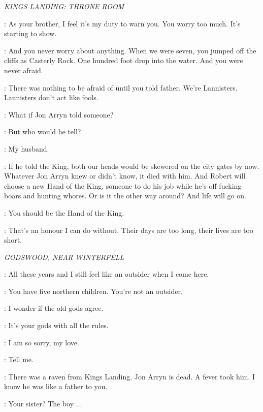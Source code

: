 \scene

\textit{KINGS LANDING: THRONE ROOM} 


\JAIME: As your brother, I feel it's my duty to warn you. You worry too much. It's starting to show. 

\CERSEI: And you never worry about anything. When we were seven, you jumped off the cliffs as Casterly Rock. One hundred foot drop into the water. And you were never afraid. 

\JAIME: There was nothing to be afraid of until you told father.  We're Lannisters. Lannisters don't act like fools. 

\CERSEI: What if Jon Arryn told someone? 

\JAIME: But who would he tell? 

\CERSEI: My husband. 

\JAIME: If he told the King, both our heads would be skewered on the city gates by now. Whatever Jon Arryn knew or didn't know, it died with him. And Robert will choose a new Hand of the King, someone to do his job while he's off fucking boars and hunting whores. Or is it the other way around? And life will go on. 

\CERSEI: You should be the Hand of the King. 

\JAIME: That's an honour I can do without. Their days are too long, their lives are too short. 


\scene

\textit{GODSWOOD, NEAR WINTERFELL} 


\CATELYN: All these years and I still feel like an outsider when I come here. 

\NED: You have five northern children. You're not an outsider. 

\CATELYN: I wonder if the old gods agree. 

\NED: It's your gods with all the rules. 

\CATELYN: I am so sorry, my love. 

\NED: Tell me. 

\CATELYN: There was a raven from Kings Landing. Jon Arryn is dead. A fever took him. I know he was like a father to you. 

\NED: Your sister? The boy $\ldots$ 


